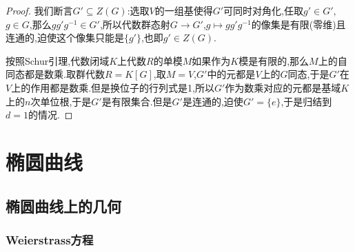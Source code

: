 \begin{enumerate}
\begin{proof}
    	\qquad
    	
    	我们断言$G'\subseteq Z(G)$:选取$V$的一组基使得$G'$可同时对角化,任取$g'\in G'$,$g\in G$,那么$gg'g^{-1}\in G'$,所以代数群态射$G\to G'$,$g\mapsto gg'g^{-1}$的像集是有限(零维)且连通的,迫使这个像集只能是$\{g'\}$,也即$g'\in Z(G)$.
    	
    	\qquad
    	
    	按照Schur引理,代数闭域$K$上代数$R$的单模$M$如果作为$K$模是有限的,那么$M$上的自同态都是数乘.取群代数$R=K[G]$,取$M=V$,$G'$中的元都是$V$上的$G$同态,于是$G'$在$V$上的作用都是数乘.但是换位子的行列式是1,所以$G'$作为数乘对应的元都是基域$K$上的$n$次单位根,于是$G'$是有限集合.但是$G'$是连通的,迫使$G'=\{e\}$,于是归结到$d=1$的情况.
    \end{proof}
\end{enumerate}
\newpage
\section{椭圆曲线}
\subsection{椭圆曲线上的几何}
\subsubsection{Weierstrass方程}


